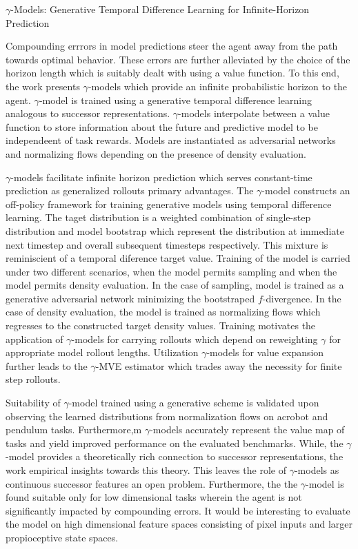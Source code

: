 \documentclass[11pt,letterpaper]{article}
\begin{document}
\begin{center}
  \large{$\gamma$-Models: Generative Temporal Difference Learning for Infinite-Horizon Prediction}
\end{center}
 Compounding errrors in model predictions steer the agent away from the path towards optimal behavior. These errors are further alleviated by the choice of the horizon length which is suitably dealt with using a value function. To this end, the work presents $\gamma$-models which provide an infinite probabilistic horizon to the agent. $\gamma$-model is trained using a generative temporal difference learning analogous to successor representations. $\gamma$-models interpolate between a value function to store information about the future and predictive model to be independeent of task rewards. Models are instantiated as adversarial networks and normalizing flows depending on the presence of density evaluation. 

 $\gamma$-models facilitate infinite horizon prediction which serves constant-time prediction as generalized rollouts primary advantages. The $\gamma$-model constructs an off-policy framework for training generative models using temporal difference learning. The taget distribution is a weighted combination of single-step distribution and model bootstrap which represent the distribution at immediate next timestep and overall subsequent timesteps respectively. This mixture is reminiscient of a temporal diference target value. Training of the model is carried under two different scenarios, when the model permits sampling and when the model permits density evaluation. In the case of sampling, model is trained as a generative adversarial network minimizing the bootstraped $f$-divergence. In the case of density evaluation, the model is trained as normalizing flows which regresses to the constructed target density values. Training motivates the application of $\gamma$-models for carrying rollouts which depend on reweighting $\gamma$ for appropriate model rollout lengths. Utilization $\gamma$-models for value expansion further leads to the $\gamma$-MVE estimator which trades away the necessity for finite step rollouts. 

Suitability of $\gamma$-model trained using a generative scheme is validated upon observing the learned distributions from normalization flows on acrobot and pendulum tasks. Furthermore,m $\gamma$-models accurately represent the value map of tasks and yield improved performance on the evaluated benchmarks. While, the $\gamma$-model provides a theoretically rich connection to successor representations, the work empirical insights towards this theory. This leaves the role of $\gamma$-models as continuous successor features an open problem. Furthermore, the the $\gamma$-model is found suitable only for low dimensional tasks wherein the agent is not significantly impacted by compounding errors. It would be interesting to evaluate the model on high dimensional feature spaces consisting of pixel inputs and larger propioceptive state spaces. 
\end{document}
